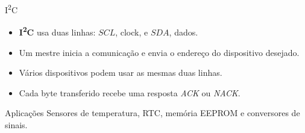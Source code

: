 \begin{frame}{I\textsuperscript{2}C}
\begin{itemize}
  \item \textbf{I\textsuperscript{2}C} usa duas linhas: \(SCL\), clock, e \(SDA\), dados.
  \item Um mestre inicia a comunicação e envia o endereço do dispositivo desejado.
  \item Vários dispositivos podem usar as mesmas duas linhas.
  \item Cada byte transferido recebe uma resposta \textit{ACK} ou \textit{NACK}.
\end{itemize}
\begin{block}{Aplicações}
Sensores de temperatura, RTC, memória EEPROM e conversores de sinais.
\end{block}
\end{frame}